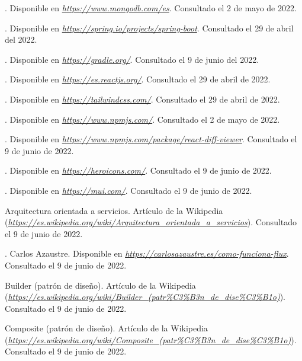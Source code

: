 \begin{thebibliography}{99}
. Disponible en {\it \url{https://www.mongodb.com/es}}. Consultado el 2 de mayo de 2022.

. Disponible en {\it \url{https://spring.io/projects/spring-boot}}. Consultado el 29 de abril del 2022.

. Disponible en {\it \url{https://gradle.org/}}. Consultado el 9 de junio del 2022.

. Disponible en {\it \url{https://es.reactjs.org/}}. Consultado el 29 de abril de 2022.

. Disponible en {\it \url{https://tailwindcss.com/}}. Consultado el 29 de abril de 2022.

. Disponible en {\it \url{https://www.npmjs.com/}}. Consultado el 2 de mayo de 2022.

. Disponible en {\it \url{https://www.npmjs.com/package/react-diff-viewer}}. Consultado el 9 de junio de 2022.

. Disponible en {\it \url{https://heroicons.com/}}. Consultado el 9 de junio de 2022.

. Disponible en {\it \url{https://mui.com/}}. Consultado el 9 de junio de 2022.

 Arquitectura orientada a servicios. Artículo de la Wikipedia ({\it \url{https://es.wikipedia.org/wiki/Arquitectura_orientada_a_servicios}}). Consultado el 9 de junio de 2022.

. Carlos Azaustre. Disponible en {\it \url{https://carlosazaustre.es/como-funciona-flux}}. Consultado el 9 de junio de 2022.

 Builder (patrón de diseño). Artículo de la Wikipedia ({\it \url{https://es.wikipedia.org/wiki/Builder_(patr%C3%B3n_de_dise%C3%B1o)}}). Consultado el 9 de junio de 2022.

 Composite (patrón de diseño). Artículo de la Wikipedia ({\it \url{https://es.wikipedia.org/wiki/Composite_(patr%C3%B3n_de_dise%C3%B1o)}}). Consultado el 9 de junio de 2022.


\end{thebibliography}
